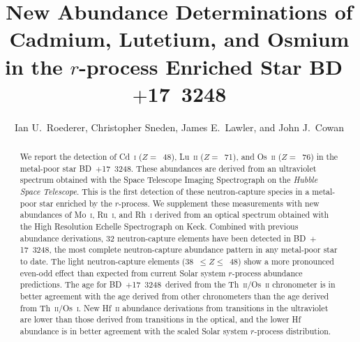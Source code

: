 \documentclass{emulateapj}
\def\bd{\mbox{BD~$+$17~3248}}
\begin{document}
\title{
New Abundance Determinations of Cadmium, Lutetium, and Osmium \\ in the 
$r$-process Enriched Star BD~$+$17~3248}



\author{
Ian U.\ Roederer,
Christopher Sneden,
James E.\ Lawler, and
John J.\ Cowan
}








\begin{abstract}


We report the detection
of Cd~\textsc{i} ($Z =$~48), 
Lu~\textsc{ii} ($Z =$~71), and Os~\textsc{ii} ($Z =$~76)
in the metal-poor star BD~$+$17~3248.
These abundances are derived from an 
ultraviolet spectrum obtained with the 
Space Telescope Imaging Spectrograph on the 
\textit{Hubble Space Telescope}.
This is the first detection of these neutron-capture
species in a metal-poor star enriched by the $r$-process.
We supplement these measurements with new abundances of
Mo~\textsc{i}, Ru~\textsc{i}, and Rh~\textsc{i} derived
from an optical spectrum obtained with the 
High Resolution Echelle Spectrograph on Keck.
Combined with previous abundance derivations,
32 neutron-capture elements have been detected in BD~$+$17~3248,
the most complete neutron-capture abundance pattern in any 
metal-poor star to date.
The light neutron-capture elements (38~$\leq Z \leq$~48)
show a more pronounced even-odd effect than expected from
current Solar system $r$-process abundance predictions.
The age for \bd\ derived from the Th~\textsc{ii}/Os~\textsc{ii}
chronometer is in better agreement with the age derived
from other chronometers than the age derived from
Th~\textsc{ii}/Os~\textsc{i}.
New Hf~\textsc{ii} abundance derivations from transitions
in the ultraviolet are lower than those derived from transitions
in the optical, and the lower Hf abundance is in 
better agreement with the scaled Solar system $r$-process distribution.


\end{abstract}
\end{document}

